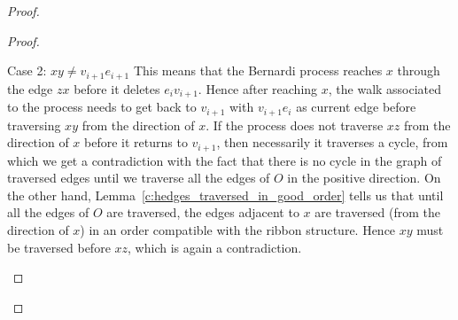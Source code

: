 \documentclass[ALCO,ThmDefs,Unicode,epreuves]{cedram}
\begin{document}
\begin{proof}
\begin{proof}
\begin{enonce*}[remark]{Case 2: $xy\neq v_{i+1}e_{i+1}$}
This means that the Bernardi process reaches $x$ through the edge $zx$ before it deletes $e_iv_{i+1}$. Hence after reaching $x$, the walk associated to the process needs to get back to $v_{i+1}$ with $v_{i+1}e_i$ as current edge before traversing $xy$ from the direction of $x$. If the process does not traverse $xz$ from the direction of $x$ before it returns to $v_{i+1}$, then necessarily it traverses a cycle, from which we get a contradiction with the fact that there is no cycle in the graph of traversed edges until we traverse all the edges of $O$ in the positive direction. On the other hand, Lemma~\ref{c:hedges_traversed_in_good_order} tells us that until all the edges of $O$ are traversed, the edges adjacent to $x$ are traversed (from the direction of $x$) in an order compatible with the ribbon structure. Hence $xy$ must be traversed before $xz$, which is again a contradiction.\qedhere
\end{enonce*}
\end{proof}


\end{proof}
\end{document}
